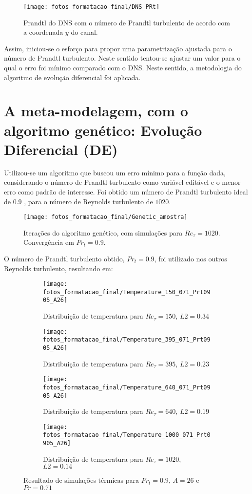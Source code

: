 \begin{figure*}[h!]
	\centering
	\texttt{[image: fotos\_formatacao\_final/DNS\_PRt]}
	\caption{Prandtl do DNS com o número de Prandtl turbulento de acordo com a coordenada $ y $ do canal.}
	\label{figure5}
\end{figure*}

Assim, iniciou-se o esforço para propor uma parametrização ajustada para o número de Prandtl turbulento.
Neste sentido tentou-se ajustar um valor para o qual o erro foi mínimo comparado com o DNS. Neste sentido, a metodologia do algoritmo de evolução diferencial foi aplicada.



\section{A meta-modelagem, com o algoritmo genético: Evolução Diferencial (DE)}
Utilizou-se um algoritmo que buscou um erro mínimo para a função dada, considerando o número de Prandtl turbulento como variável editável e o menor erro como padrão de interesse.
Foi obtido um número de Prandtl turbulento ideal de $ 0.9$ , para o número de Reynolds turbulento de $ 1020$.
\begin{figure}[!h]
	\centering
	\texttt{[image: fotos\_formatacao\_final/Genetic\_amostra]}
	\caption{Iterações do algoritmo genético, com simulações para $Re_\tau = 1020$. Convergência em $Pr_t = 0.9 $.}
\end{figure}

O número de Prandtl turbulento obtido, $Pr_t = 0.9$, foi utilizado nos outros Reynolds turbulento, resultando em:
\begin{figure*}[!h]
	\centering
	\begin{subfigure}[t]{0.5\textwidth}
		\centering
		\texttt{[image: fotos\_formatacao\_final/Temperature\_150\_071\_Prt0905\_A26]}
		\caption{Distribuição de temperatura para $Re_\tau = 150$, $L2 = 0.34$}
	\end{subfigure}
	\begin{subfigure}[t]{0.45\textwidth}
		\centering
		\texttt{[image: fotos\_formatacao\_final/Temperature\_395\_071\_Prt0905\_A26]}
		\caption{Distribuição de temperatura para $Re_\tau = 395$, $L2 = 0.23$}
	\end{subfigure}
	\begin{subfigure}[t]{0.5\textwidth}
		\centering
		\texttt{[image: fotos\_formatacao\_final/Temperature\_640\_071\_Prt0905\_A26]}
		\caption{Distribuição de temperatura para $Re_\tau = 640$, $L2 = 0.19$}
	\end{subfigure}
	\begin{subfigure}[t]{0.45\textwidth}
		\centering
		\texttt{[image: fotos\_formatacao\_final/Temperature\_1000\_071\_Prt0905\_A26]}
		\caption{Distribuição de temperatura para $Re_\tau = 1020$, $L2 = 0.14$}
	\end{subfigure}	
	\caption{Resultado de simulações térmicas para $Pr_t = 0.9 $, $A = 26$ e $Pr =0.71$ }
\end{figure*}

